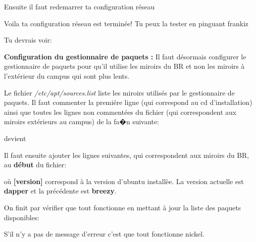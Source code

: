 Ensuite il faut redemarrer ta configuration r\'eseau


Voila ta configuration r\'eseau est termin\'ee! Tu peux la tester en pinguant frankiz


Tu devrais voir:


{\bf Configuration du gestionnaire de paquets :}
Il faut d\'esormais configurer le gestionnaire de paquets pour qu'il utilise les miroirs du BR
et non les miroirs \`a l'ext\'erieur du campus qui sont plus lents.

Le fichier \emph{/etc/apt/sources.list} liste les miroirs utilis\'es par le gestionnaire de paquets.
Il faut commenter la premi\'ere ligne (qui correspond au cd d'installation)
ainsi que toutes les lignes non comment\'ees du fichier
(qui correspondent aux miroirs ext\'erieurs au campus) de la fa�n suivante:


devient


Il faut ensuite ajouter les lignes suivantes, qui correspondent aux miroirs du BR, au \textbf{d\'ebut} du fichier:


o\`u \textbf{[version]} correspond \`a la version d'ubuntu install\`ee. La version actuelle est \textbf{dapper} et la pr\'ec\'edente est \textbf{breezy}.

On finit par v\'erifier que tout fonctionne en mettant \`a jour la liste des paquets disponibles:


S'il n'y a pas de message d'erreur c'est que tout fonctionne nickel.
